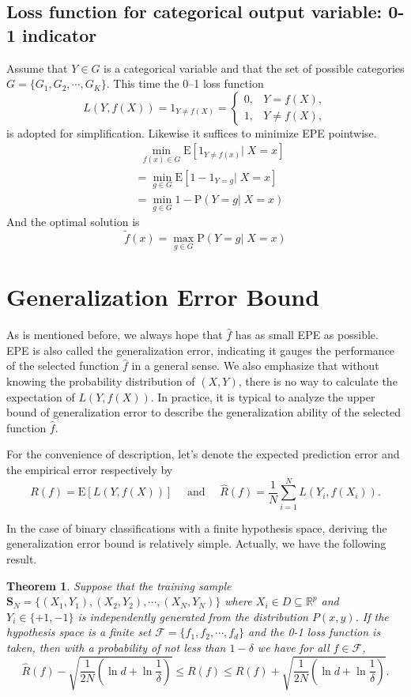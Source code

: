 \documentclass{report}
\newtheorem{theorem}{Theorem}[chapter]
\theoremstyle{nonumberplain}
\newcommand{\0}{\mathbf{0}}
\begin{document}
\subsection{Loss function for categorical output variable: 0-1 indicator}
Assume that $Y\in G$ is a categorical variable and that the set of possible categories $G=\{G_1,G_2,\cdots,G_K\}$. This time the 0–1 loss function 
\[
L(Y,f(X))=1_{Y\ne f(X)}=
\begin{cases}
0,&Y=f(X),\\
1,&Y\ne f(X),
\end{cases}
\]
is adopted for simplification. Likewise it suffices to minimize EPE pointwise.
\begin{align*}
&\ \ \min_{f(x)\in G}\mathrm{E}[1_{Y\ne f(x)}|\; X=x]\\
&=\min_{g\in G}\mathrm{E}[1-1_{Y=g}|\; X=x]\\
&=\min_{g\in G}1-\mathrm{P}(Y=g|\; X=x)
\end{align*}
And the optimal solution is
\[
\tilde{f}(x)=\max_{g\in G} \mathrm{P}(Y=g|\; X=x)
\]

\section{Generalization Error Bound}

As is mentioned before, we always hope that $\hat{f}$ has as small EPE as possible. EPE is also called the generalization error, indicating it gauges the performance of the selected function $\hat{f}$ in a general sense. We also emphasize that without knowing the probability distribution of $(X,Y)$, there is no way to calculate the expectation of $L(Y,f(X))$. In practice, it is typical to analyze the upper bound of generalization error to describe the generalization ability of the selected function $\hat{f}$. 

For the convenience of description, let's denote the expected prediction error and the empirical error respectively by
\[
R(f)=\mathrm{E}[L(Y,f(X))]\quad\text{ and }\quad\widehat{R}(f)=\frac{1}{N} \sum_{i=1}^{N} L\left(Y_{i}, f\left(X_{i}\right)\right).
\]

In the case of binary classifications with a finite hypothesis space, deriving the generalization error bound is relatively simple. Actually, we have the following result.

\begin{theorem}
	Suppose that the training sample $\mathbf{S}_N=\{(X_1,Y_1),(X_2,Y_2),\cdots,(X_{N},Y_{N})\}$ where $X_i\in D\subseteq\mathbb{R}^p$ and $Y_i\in\{+1,-1\}$ is  independently generated from the distribution $P(x,y)$. If the hypothesis space is a finite set $\mathcal{F}=\{f_1,f_2,\cdots,f_d\}$ and the 0-1 loss function is taken, then  with a probability of not less than $1-\delta$ we have for all $f\in \mathcal{F}$,
	\[
	\widehat{R}(f)-\sqrt{\frac{1}{2 N}\left(\ln d+\ln \frac{1}{\delta}\right)}\le R(f) \le \widehat{R}(f)+\sqrt{\frac{1}{2 N}\left(\ln d+\ln \frac{1}{\delta}\right)}.
	\]
\end{theorem}
\end{document}
